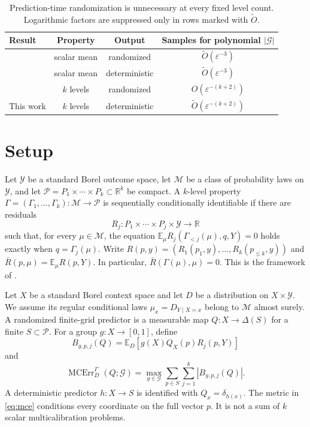 \documentclass{article}
\theoremstyle{definition}
\theoremstyle{remark}
\newcommand{\E}{\mathbb E}
\newcommand{\1}{\mathbf 1}
\newcommand{\cG}{\mathcal G}
\newcommand{\cM}{\mathcal M}
\newcommand{\cP}{\mathcal P}
\newcommand{\simplex}{\Delta}
\newcommand{\MCE}{\operatorname{MCErr}}
\begin{document}
\begin{table}[t]
\centering
\small \setlength{\tabcolsep}{5pt}
\begin{tabular}{@{}lccc@{}}
\toprule
Result & Property & Output & Samples for polynomial $|\cG|$ \\
\midrule
\citet{collina2026sample} & scalar mean & randomized & $\widetilde O(\varepsilon^{-3})$ \\
\citet{noarovroth2026deterministic} & scalar mean & deterministic & $\widetilde O(\varepsilon^{-3})$ \\
\citet{lu2026multilevel} & $k$ levels & randomized & $O(\varepsilon^{-(k+2)})$ \\
This work & $k$ levels & deterministic & $\widetilde O(\varepsilon^{-(k+2)})$ \\
\bottomrule
\end{tabular}
\caption{Prediction-time randomization is unnecessary at every fixed level count. Logarithmic factors are suppressed only in rows marked with $\widetilde O$.}
\label{tab:comparison}
\end{table}

\section{Setup}

Let $\mathcal Y$ be a standard Borel outcome space, let $\cM$ be a class of probability laws on $\mathcal Y$, and let $\cP=P_1\times\cdots\times P_k\subset\mathbb R^k$ be compact. A $k$-level property $\Gamma=(\Gamma_1,\ldots,\Gamma_k):\cM\to\cP$ is sequentially conditionally identifiable if there are residuals \[ R_j:P_1\times\cdots\times P_j\times\mathcal Y\to\mathbb R \] such that, for every $\mu\in\cM$, the equation $\E_\mu R_j(\Gamma_{<j}(\mu),q,Y)=0$ holds exactly when $q=\Gamma_j(\mu)$. Write $R(p,y)=(R_1(p_1,y),\ldots,R_k(p_{\le k},y))$ and $\bar R(p,\mu)=\E_\mu R(p,Y)$. In particular, $\bar R(\Gamma(\mu),\mu)=0$. This is the framework of \citet{lu2026multilevel}.

Let $X$ be a standard Borel context space and let $D$ be a distribution on $X\times\mathcal Y$. We assume its regular conditional laws $\mu_x=D_{Y\mid X=x}$ belong to $\cM$ almost surely. A randomized finite-grid predictor is a measurable map $Q:X\to\simplex(S)$ for a finite $S\subset\cP$. For a group $g:X\to[0,1]$, define \[ B_{g,p,j}(Q)=\E_D[g(X)Q_X(p)R_j(p,Y)] \] and
\begin{equation}
\MCE_D^\Gamma(Q;\cG)=\max_{g\in\cG}\sum_{p\in S}\sum_{j=1}^k|B_{g,p,j}(Q)|.
\label{eq:mce}
\end{equation}
A deterministic predictor $h:X\to S$ is identified with $Q_x=\delta_{h(x)}$. The metric in \eqref{eq:mce} conditions every coordinate on the full vector $p$. It is not a sum of $k$ scalar multicalibration problems.
\end{document}
